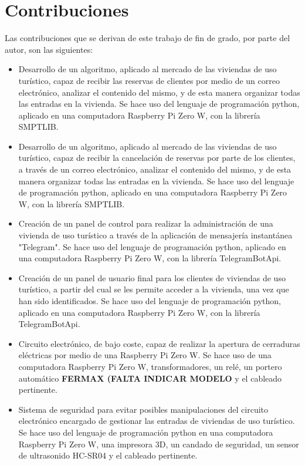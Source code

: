 \chapter{Contribuciones}
\label{ch:contribuciones}

Las contribuciones que se derivan de este trabajo de fin de grado, por parte del autor, son las siguientes:
\begin{itemize}
\item Desarrollo de un algoritmo, aplicado al mercado de las viviendas de uso turístico, capaz de recibir las reservas de clientes por medio de un correo electrónico, analizar el contenido del mismo, y de esta manera organizar todas las entradas en la vivienda. Se hace uso del lenguaje de programación python, aplicado en una computadora Raspberry Pi Zero W, con la librería SMPTLIB.
\item Desarrollo de un algoritmo, aplicado al mercado de las viviendas de uso turístico, capaz de recibir la cancelación de reservas por parte de los clientes, a través de un correo electrónico, analizar el contenido del mismo, y de esta manera organizar todas las entradas en la vivienda. Se hace uso del lenguaje de programación python, aplicado en una computadora Raspberry Pi Zero W, con la librería SMPTLIB.
\item Creación de un panel de control para realizar la administración de una vivienda de uso turístico a través de la aplicación de mensajería instantánea "Telegram". Se hace uso del lenguaje de programación python, aplicado en una computadora Raspberry Pi Zero W, con la librería TelegramBotApi.
\item Creación de un panel de usuario final para los clientes de viviendas de uso turístico, a partir del cual se les permite acceder a la vivienda, una vez que han sido identificados. Se hace uso del lenguaje de programación python, aplicado en una computadora Raspberry Pi Zero W, con la librería TelegramBotApi.
\item Circuito electrónico, de bajo coste, capaz de realizar la apertura de cerraduras eléctricas por medio de una Raspberry Pi Zero W. Se hace uso de una computadora Raspberry Pi Zero W, transformadores, un relé, un portero automático \textbf{FERMAX (FALTA INDICAR MODELO} y el cableado pertinente.
\item Sistema de seguridad para evitar posibles manipulaciones del circuito electrónico encargado de gestionar las entradas de viviendas de uso turístico. Se hace uso del lenguaje de programación python en una computadora Raspberry Pi Zero W, una impresora 3D, un candado de seguridad, un sensor de ultrasonido HC-SR04 y el cableado pertinente.
\end{itemize}